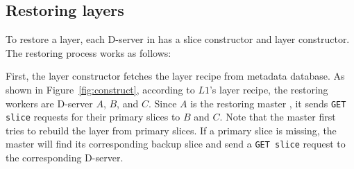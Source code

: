 \subsection{Restoring layers}
\label{sec:restore-desgin}





To restore a layer, each D-server in \sysname has a slice constructor and
layer constructor. The restoring process works as follows:

First, the layer constructor fetches the layer recipe from metadata database.
As shown in Figure~\ref{fig:construct}, according to $L1$'s layer recipe, 
the restoring workers are D-server $A$, $B$, and $C$.
Since $A$ is the restoring master ,
it sends \texttt{GET slice} requests for their primary slices to $B$ and $C$.
Note that the master first tries to rebuild the layer from primary slices.
If a primary slice is missing, the master will find its corresponding backup
slice and send a \texttt{GET slice} request to the corresponding D-server.



